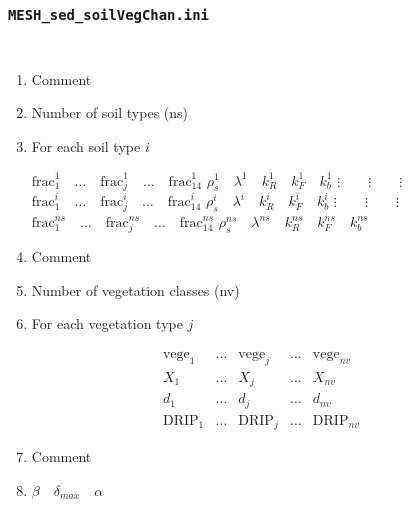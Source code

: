 \documentclass{beamer}
\begin{document}
\begin{frame} \frametitle{\texttt{MESH\_sed\_soilVegChan.ini}}
\begin{columns}
{\tiny
\begin{enumerate}[label=Line \arabic*]\itemsep0em 
\item Comment
\item Number of soil types (ns)
\item For each soil type $i$
\parbox{\textwidth}{

$\text{frac}_1^1 \quad\hdots\quad \text{frac}_j^1 \quad\hdots\quad \text{frac}_{14}^1$ \newline
$\rho_s^1 \quad \lambda^1 \quad k_R^1 \quad k_F^1 \quad k_b^1$ \newline
$\vdots \quad\quad \vdots \quad\quad \vdots$ \newline
$\text{frac}_1^i \quad\hdots\quad \text{frac}_j^i \quad\hdots\quad \text{frac}_{14}^i$ \newline
$\rho_s^i \quad \lambda^i \quad k_R^i \quad k_F^i \quad k_b^i$ \newline
$\vdots \quad\quad \vdots \quad\quad \vdots$ \newline
$\text{frac}_1^{ns} \quad\hdots\quad \text{frac}_j^{ns} \quad\hdots\quad \text{frac}_{14}^{ns}$ \newline
$\rho_s^{ns} \quad \lambda^{ns} \quad k_R^{ns} \quad k_F^{ns} \quad k_b^{ns}$
}
\item Comment
\item Number of vegetation classes (nv)
\item For each vegetation type $j$
\parbox{\textwidth}{
\[
\begin{matrix} 
\text{vege}_1 & \hdots & \text{vege}_j & \hdots & \text{vege}_{nv} \\
X_1 & \hdots & X_j & \hdots & X_{nv} \\
d_1 & \hdots & d_j & \hdots & d_{nv} \\
\text{DRIP}_1 & \hdots & \text{DRIP}_j & \hdots & \text{DRIP}_{nv}
\end{matrix}
\]
}
\item Comment
\item $\beta \quad \delta_{max} \quad \alpha$
\end{enumerate}
}
{\tiny
\begin{itemize}[label={}]

\end{itemize}}
\end{columns}
\end{frame}
\end{document}
